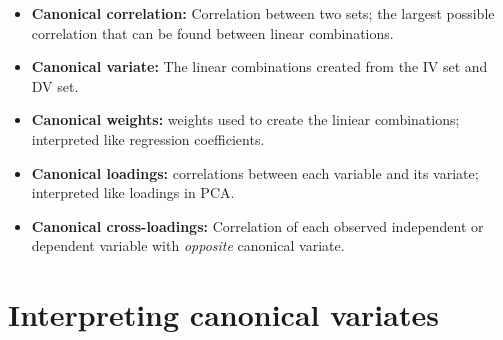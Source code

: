 \documentclass[]{book}
\providecommand{\tightlist}{%
  \setlength{\itemsep}{0pt}\setlength{\parskip}{0pt}}
\begin{document}
\begin{itemize}
\tightlist
\item
  \textbf{Canonical correlation:} Correlation between two sets; the
  largest possible correlation that can be found between linear
  combinations.
\item
  \textbf{Canonical variate:} The linear combinations created from the
  IV set and DV set.
\item
  \textbf{Canonical weights:} weights used to create the liniear
  combinations; interpreted like regression coefficients.
\item
  \textbf{Canonical loadings:} correlations between each variable and
  its variate; interpreted like loadings in PCA.
\item
  \textbf{Canonical cross-loadings:} Correlation of each observed
  independent or dependent variable with \emph{opposite} canonical
  variate.
\end{itemize}

\section{Interpreting canonical
variates}\label{interpreting-canonical-variates}
\end{document}
